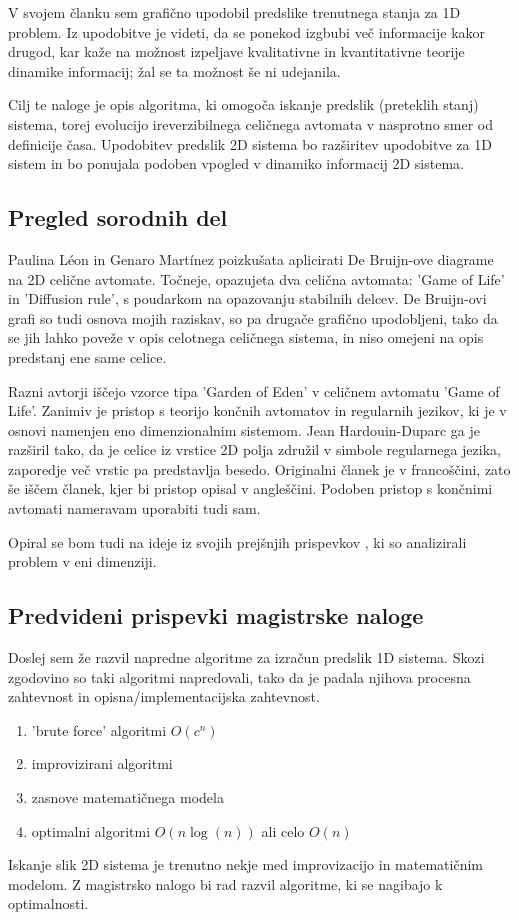 \documentclass[a4paper, 12pt]{article}
\begin{document}
V svojem članku \cite{JerasDobnikar2007} sem grafično upodobil predslike trenutnega stanja za 1D problem.
Iz upodobitve je videti, da se ponekod izgbubi več informacije kakor drugod,
kar kaže na možnost izpeljave kvalitativne in kvantitativne teorije dinamike informacij;
žal se ta možnost še ni udejanila.

Cilj te naloge je opis algoritma, ki omogoča iskanje predslik (preteklih stanj) sistema, torej evolucijo
ireverzibilnega celičnega avtomata v nasprotno smer od definicije časa.
Upodobitev predslik 2D sistema bo razširitev upodobitve za 1D sistem
in bo ponujala podoben vpogled v dinamiko informacij 2D sistema.

\subsection{Pregled sorodnih del}

Paulina Léon in Genaro Martínez \cite{PaulinaGenaro2016} poizkušata aplicirati
De Bruijn-ove diagrame na 2D celične avtomate. Točneje, opazujeta dva celična avtomata:
'Game of Life' in 'Diffusion rule', s poudarkom na opazovanju stabilnih delcev.
De Bruijn-ovi grafi so tudi osnova mojih raziskav, so pa drugače grafično upodobljeni,
tako da se jih lahko poveže v opis celotnega celičnega sistema, in niso omejeni na
opis predstanj ene same celice.

Razni avtorji \cite{Hartman2013} iščejo vzorce tipa 'Garden of Eden' v celičnem avtomatu 'Game of Life'.
Zanimiv je pristop s teorijo končnih avtomatov in regularnih jezikov, ki je v
osnovi namenjen eno dimenzionalnim sistemom. Jean Hardouin-Duparc ga je razširil
tako, da je celice iz vrstice 2D polja združil v simbole regularnega jezika, zaporedje več
vrstic pa predstavlja besedo. Originalni članek je v francoščini, zato še iščem članek,
kjer bi pristop opisal v angleščini. Podoben pristop s končnimi avtomati nameravam uporabiti tudi sam.

Opiral se bom tudi na ideje iz svojih prejšnjih prispevkov \cite{JerasDobnikar2007}
\cite{DBLP:conf/iccS/JerasD06} \cite{DBLP:conf/automata/Jeras08},
ki so analizirali problem v eni dimenziji.

\subsection{Predvideni prispevki magistrske naloge}

Doslej sem že razvil napredne algoritme za izračun predslik 1D sistema.
Skozi zgodovino so taki algoritmi napredovali, tako da je padala njihova
procesna zahtevnost in opisna/implementacijska zahtevnost.
\begin{enumerate}
\item 'brute force' algoritmi \( O(c^n) \)
\item improvizirani algoritmi
\item zasnove matematičnega modela
\item optimalni algoritmi \( O(n \log(n)) \) ali celo \( O(n) \)
\end{enumerate}
Iskanje slik 2D sistema je trenutno nekje med improvizacijo in matematičnim modelom.
Z magistrsko nalogo bi rad razvil algoritme, ki se nagibajo k optimalnosti.
\end{document}
